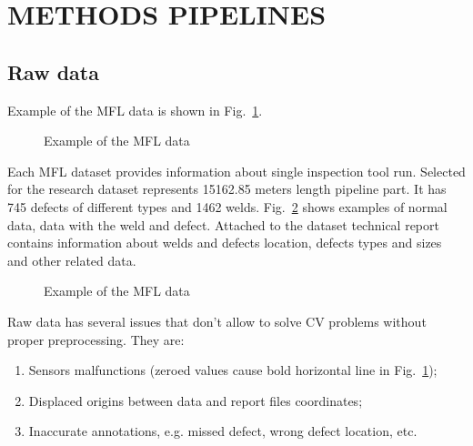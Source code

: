 \section{METHODS PIPELINES}
\label{METHODS PIPELINES}
\subsection{Raw data}
Example of the MFL data is shown in Fig.~\ref{ris:data_example}.

\begin{figure}[ht]
	\caption{Example of the MFL data}
	\label{ris:data_example}
\end{figure}
Each MFL dataset provides information about single inspection tool run.
Selected for the research dataset represents 15162.85 meters length pipeline part.
It has 745 defects of different types and 1462 welds.
Fig.~\ref{ris:defect_example} shows examples of normal data, data with the weld and defect.
Attached to the dataset technical report contains information about welds and defects location, defects types and sizes and other related data.
\begin{figure}[ht]
	\caption{Example of the MFL data}
	\label{ris:defect_example}
\end{figure}

Raw data has several issues that don't allow to solve CV problems without proper preprocessing.
They are:
\begin{enumerate}
	\item Sensors malfunctions (zeroed values cause bold horizontal line in Fig.~\ref{ris:data_example});
	\item Displaced origins between data and report files coordinates;
	\item Inaccurate annotations, e.g. missed defect, wrong defect location, etc.
\end{enumerate}

